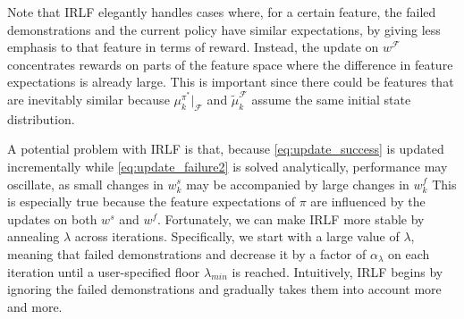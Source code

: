\documentclass[letterpaper]{article}
\DeclareMathOperator*{\argmax}{\arg\!\max}
\newcommand{\sw}[1]{\textcolor{red}{SW: #1}}
\newcommand{\jm}[1]{\textcolor{blue}{Joao: #1}}
\newcommand{\ks}[1]{\textcolor{green}{Kyriacos: #1}}
\newcommand{\sw}[1]{}
\newcommand{\jm}[1]{}
\newcommand{\ks}[1]{}
\begin{document}
Note that IRLF elegantly handles cases where, for a certain feature, the failed demonstrations and the current policy have similar expectations, by giving less emphasis to that feature in terms of reward. Instead, the update on $w^{\mathcal{F}}$ concentrates rewards on parts of the feature space where the difference in feature expectations is already large. This is important since there could be features that are inevitably similar because $\mu^{\pi^*}_k|_{\mathcal{F}}$ 
and $\widetilde{\mu}^{\mathcal{F}}_k$ assume the same initial state distribution.


A potential problem with IRLF is that, because \eqref{eq:update_success} is updated incrementally while \eqref{eq:update_failure2} is solved analytically, performance may oscillate, as small changes in $w^s_k$ may be accompanied by large changes in $w^f_k$ 
This is especially true because the feature expectations of $\pi$ are influenced by the updates on both $w^s$ and $w^f$. Fortunately, we can make IRLF more stable by annealing $\lambda$ across iterations.  Specifically, we start with a large value of $\lambda$, meaning that failed demonstrations and decrease it by a factor of $\alpha_{\lambda}$ 
on each iteration until a user-specified floor $\lambda_{min}$ 
is reached.  Intuitively, IRLF begins by ignoring the failed demonstrations and gradually takes them into account more and more.

	
\end{document}
